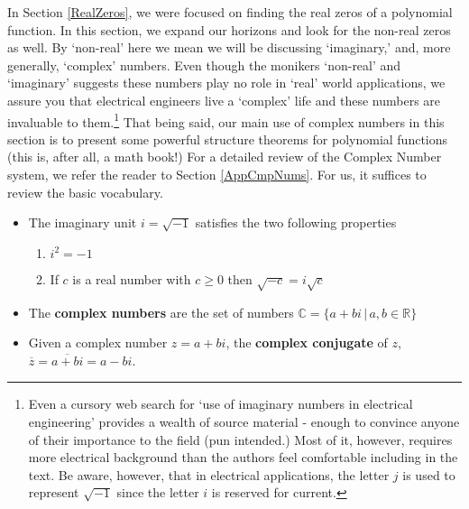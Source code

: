 

\setcounter{footnote}{0}

\label{ComplexZeros}

In Section \ref{RealZeros}, we were focused on finding the real zeros of a polynomial function.  In this section, we expand our horizons and look for the non-real zeros as well. By `non-real' here we mean we will be discussing `imaginary,' and, more generally, `complex' numbers.  Even though the monikers `non-real' and `imaginary' suggests these numbers play no role in `real' world applications, we assure you that electrical engineers live a `complex' life and these numbers are invaluable to them.\footnote{Even a cursory web search for `use of imaginary numbers in electrical engineering' provides a wealth of source material - enough to convince anyone of their importance to the field (pun intended.)  Most of it, however, requires more electrical background than the authors feel comfortable including in the text.  Be aware, however, that in electrical applications, the letter $j$ is used to represent $\sqrt{-1}$ since the letter $i$ is reserved for current.}  That being said, our main use of complex numbers in this section is to present some powerful structure theorems for polynomial functions (this is, after all, a math book!)  For a detailed review of the Complex Number system, we refer the reader to Section \ref{AppCmpNums}.  For us, it suffices to review the basic vocabulary.  

\begin{tcolorbox}

\begin{itemize}
 
\item The imaginary unit $i = \sqrt{-1}$ satisfies the two following properties

\begin{enumerate}

\item  $i^2 = -1$

\item  If $c$ is a real number with $c \geq 0$ then $\sqrt{-c} = i \sqrt{c}$

\end{enumerate}

\item The \textbf{complex numbers} are the set of numbers $\mathbb{C} = \{ a + bi \, | \, a, b \in \mathbb{R} \}$

\item  Given a complex number $z = a+bi$, the \textbf{complex conjugate} of $z$, $\overline{z}  = \overline{a+bi} = a - bi$.

\end{itemize}

\end{tcolorbox}

